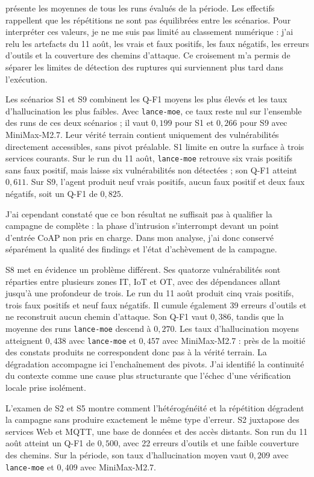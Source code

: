  présente les moyennes de tous les runs évalués de la
période. Les effectifs rappellent que les répétitions ne sont pas équilibrées
entre les scénarios. Pour interpréter ces valeurs, je ne me suis pas limité au
classement numérique : j'ai relu les artefacts du 11 août, les vrais et faux
positifs, les faux négatifs, les erreurs d'outils et la couverture des chemins
d'attaque. Ce croisement m'a permis de séparer les limites de détection des
ruptures qui surviennent plus tard dans l'exécution.

Les scénarios S1 et S9 combinent les Q-F1 moyens les plus élevés et les taux
d'hallucination les plus faibles. Avec \texttt{\footnotesize lance-moe}, ce
taux reste nul sur l'ensemble des runs de ces deux scénarios ; il vaut
\(0{,}199\) pour S1 et \(0{,}266\) pour S9 avec MiniMax-M2.7. Leur vérité
terrain contient uniquement des vulnérabilités directement accessibles, sans
pivot préalable. S1 limite en outre la surface à trois services courants. Sur
le run du 11 août, \texttt{\footnotesize lance-moe} retrouve six vrais positifs
sans faux positif, mais laisse six vulnérabilités non détectées ; son Q-F1
atteint \(0{,}611\). Sur S9, l'agent produit neuf vrais positifs, aucun faux
positif et deux faux négatifs, soit un Q-F1 de \(0{,}825\).

J'ai cependant constaté que ce bon résultat ne suffisait pas à qualifier la
campagne de complète : la phase d'intrusion s'interrompt devant un point
d'entrée CoAP non pris en charge. Dans mon analyse, j'ai donc conservé
séparément la qualité des findings et l'état d'achèvement de la campagne.

S8 met en évidence un problème différent. Ses quatorze vulnérabilités sont
réparties entre plusieurs zones IT, IoT et OT, avec des dépendances allant
jusqu'à une profondeur de trois. Le run du 11 août produit cinq vrais positifs,
trois faux positifs et neuf faux négatifs. Il cumule également 39 erreurs
d'outils et ne reconstruit aucun chemin d'attaque. Son Q-F1 vaut \(0{,}386\),
tandis que la moyenne des runs \texttt{\footnotesize lance-moe} descend à
\(0{,}270\). Les taux d'hallucination moyens atteignent \(0{,}438\) avec
\texttt{\footnotesize lance-moe} et \(0{,}457\) avec MiniMax-M2.7 : près de la
moitié des constats produits ne correspondent donc pas à la vérité terrain. La
dégradation accompagne ici l'enchaînement des pivots. J'ai identifié la
continuité du contexte comme une cause plus structurante que l'échec d'une
vérification locale prise isolément.

L'examen de S2 et S5 montre comment l'hétérogénéité et la répétition dégradent
la campagne sans produire exactement le même type d'erreur. S2 juxtapose des
services Web et MQTT, une base de données et des accès distants. Son run du
11 août atteint un Q-F1 de \(0{,}500\), avec 22 erreurs d'outils et une faible
couverture des chemins. Sur la période, son taux d'hallucination moyen vaut
\(0{,}209\) avec \texttt{\footnotesize lance-moe} et \(0{,}409\) avec
MiniMax-M2.7.

